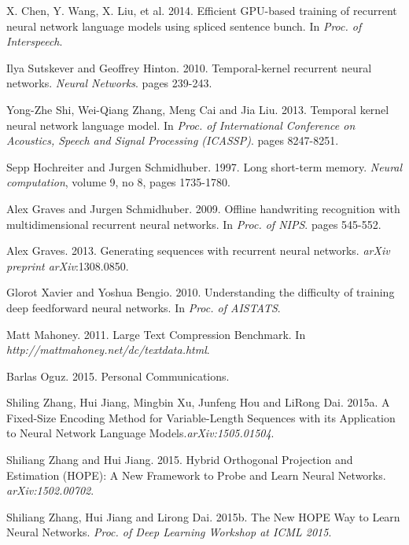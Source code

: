 \documentclass[11pt]{article}
\begin{document}
\begin{thebibliography}{}
 X. Chen, Y. Wang, X. Liu, et al. 2014. Efficient GPU-based training of recurrent neural network language models using spliced sentence bunch. In {\em Proc. of Interspeech}.

 Ilya Sutskever and Geoffrey Hinton. 2010. Temporal-kernel recurrent neural networks. {\em Neural Networks}. pages 239-243.

 Yong-Zhe Shi, Wei-Qiang Zhang, Meng Cai and Jia Liu. 2013. Temporal kernel neural network language model. In {\em Proc. of International Conference on Acoustics, Speech and Signal Processing (ICASSP)}. pages 8247-8251.

 Sepp Hochreiter and Jurgen Schmidhuber. 1997. Long short-term memory.  {\em Neural computation}, volume 9, no 8, pages 1735-1780.


 Alex Graves and Jurgen Schmidhuber. 2009. Offline handwriting recognition with multidimensional recurrent neural networks. In {\em Proc. of NIPS}. pages 545-552.

 Alex Graves. 2013. Generating sequences with recurrent neural networks. {\em arXiv preprint arXiv}:1308.0850.

 Glorot Xavier and Yoshua Bengio. 2010. Understanding the difficulty of training deep feedforward neural networks. In {\em Proc. of AISTATS}. 

 Matt Mahoney. 2011. Large Text Compression Benchmark. In {\em http://mattmahoney.net/dc/textdata.html}.

 Barlas Oguz. 2015. Personal Communications. 

 Shiling Zhang, Hui Jiang, Mingbin Xu, Junfeng Hou and LiRong Dai. 2015a. A Fixed-Size Encoding Method for Variable-Length Sequences with its Application to Neural Network Language Models.{\em arXiv:1505.01504}.

 Shiliang Zhang and Hui Jiang. 2015. Hybrid Orthogonal Projection and Estimation ({HOPE}): A New Framework to Probe and Learn Neural Networks. {\em arXiv:1502.00702}.

 Shiliang Zhang, Hui Jiang and Lirong Dai. 2015b. The New HOPE Way to Learn Neural Networks. {\em Proc. of Deep Learning Workshop at ICML 2015}.

\end{thebibliography}
\end{document}
